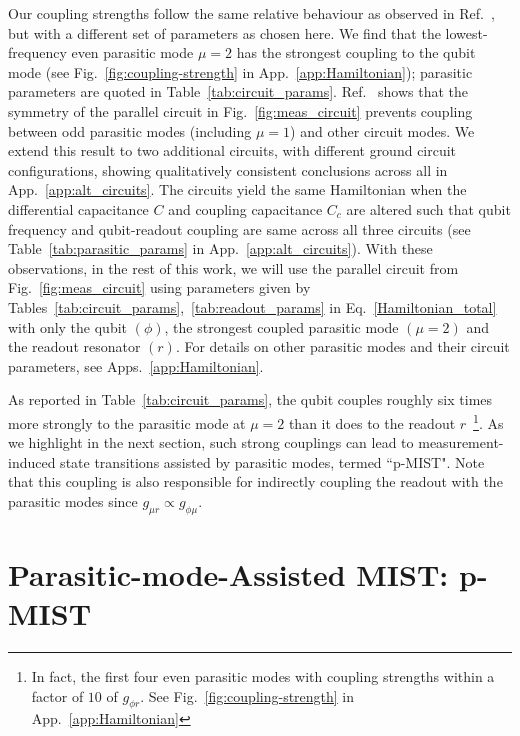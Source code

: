 \documentclass[%
reprint,
superscriptaddress,
 amsmath,amssymb,
 aps,
 prx,
longbibliography,
floatfix,
]{revtex4-2}
\begin{document}
 Our coupling strengths follow the same relative behaviour as observed in Ref.~\cite{viola2015collective}, but with a different set of parameters as chosen here. We find that the lowest-frequency even parasitic mode $\mu=2$ has the strongest coupling to the qubit mode (see Fig.~\ref{fig:coupling-strength} in App.~\ref{app:Hamiltonian}); parasitic parameters are quoted in Table~\ref{tab:circuit_params}. Ref.~\cite{viola2015collective} shows that the symmetry of the parallel circuit in Fig.~\ref{fig:meas_circuit} prevents coupling between odd parasitic modes (including $\mu=1$) and other circuit modes. We extend this result to two additional circuits, with different ground circuit configurations, showing qualitatively consistent conclusions across all in App.~\ref{app:alt_circuits}. The circuits yield the same Hamiltonian when the differential capacitance $C$ and coupling capacitance $C_c$ are altered such that qubit frequency and qubit-readout coupling are same across all three circuits (see Table~\ref{tab:parasitic_params} in App.~\ref{app:alt_circuits}). With these observations, in the rest of this work, we will use the parallel circuit from Fig.~\ref{fig:meas_circuit} using parameters given by Tables~\ref{tab:circuit_params},~\ref{tab:readout_params} in Eq.~\ref{Hamiltonian_total} with only the qubit $(\phi)$, the strongest coupled parasitic mode $(\mu=2)$ and the readout resonator $(r)$. For details on other parasitic modes and their circuit parameters, see Apps.~\ref{app:Hamiltonian}. 
 
As reported in Table~\ref{tab:circuit_params}, the qubit couples roughly six times more strongly to the parasitic mode at $\mu=2$ than it does to the readout $r$~\footnote{In fact, the first four even parasitic modes with coupling strengths within a factor of $10$ of $g_{\phi r}$. See Fig.~\ref{fig:coupling-strength} in App.~\ref{app:Hamiltonian}}. As we highlight in the next section, such strong couplings can lead to measurement-induced state transitions assisted by parasitic modes, termed ``p-MIST". Note that this coupling is also responsible for indirectly coupling the readout with the parasitic modes since $g_{\mu r}\propto g_{\phi\mu}$. 

\section{Parasitic-mode-Assisted MIST: p-MIST}\label{sec:MIST}
\end{document}
